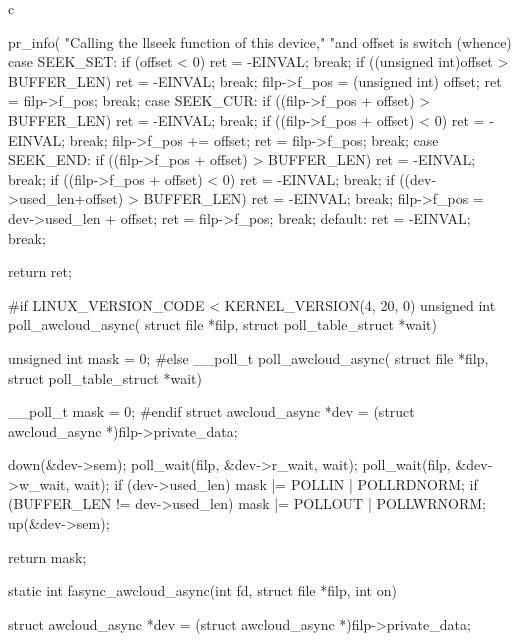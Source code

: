 \begin{code-block}{c}
{{        pr_info(
                "Calling the llseek function of this device,"
                "and offset is %
        switch (whence) {
        case SEEK_SET:
                if (offset < 0) {
                        ret = -EINVAL;
                        break;
                }
                if ((unsigned int)offset > BUFFER_LEN) {
                        ret = -EINVAL;
                        break;
                }
                filp->f_pos = (unsigned int) offset;
                ret = filp->f_pos;
                break;
        case SEEK_CUR:
                if ((filp->f_pos + offset) > BUFFER_LEN) {
                        ret = -EINVAL;
                        break;
                }
                if ((filp->f_pos + offset) < 0) {
                        ret = -EINVAL;
                        break;
                }
                filp->f_pos += offset;
                ret = filp->f_pos;
                break;
        case SEEK_END:
                if ((filp->f_pos + offset) > BUFFER_LEN) {
                        ret = -EINVAL;
                        break;
                }
                if ((filp->f_pos + offset) < 0) {
                        ret = -EINVAL;
                        break;
                }
                if ((dev->used_len+offset) > BUFFER_LEN) {
                        ret = -EINVAL;
                        break;
                }
                filp->f_pos = dev->used_len + offset;
                ret = filp->f_pos;
                break;
        default:
                ret = -EINVAL;
                break;
        }

        return ret;
}

#if LINUX_VERSION_CODE < KERNEL_VERSION(4, 20, 0)
unsigned int poll_awcloud_async(
        struct file *filp, struct poll_table_struct *wait)
{
        unsigned int mask = 0;
#else
__poll_t poll_awcloud_async(
        struct file *filp, struct poll_table_struct *wait)
{
        __poll_t mask = 0;
#endif
        struct awcloud_async *dev = (struct awcloud_async *)filp->private_data;

        down(&dev->sem);
        poll_wait(filp, &dev->r_wait, wait);
        poll_wait(filp, &dev->w_wait, wait);
        if (dev->used_len) {
                mask |= POLLIN | POLLRDNORM;
        }
        if (BUFFER_LEN != dev->used_len) {
                mask |= POLLOUT | POLLWRNORM;
        }
        up(&dev->sem);

        return mask;
}

static int fasync_awcloud_async(int fd, struct file *filp, int on)
{
        struct awcloud_async *dev = (struct awcloud_async *)filp->private_data;

}}}
\end{code-block}
